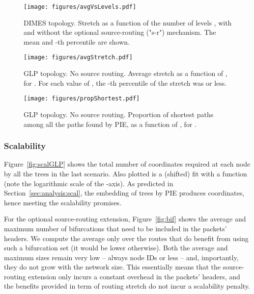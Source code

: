 \documentclass[conference]{IEEEtran}
\begin{document}
\begin{figure}
\centering
\vspace{0.03in}
\texttt{[image: figures/avgVsLevels.pdf]}\vspace{-0.7em}
\caption{DIMES topology. Stretch as a function of the number of levels , with and without the optional source-routing ("s-r") mechanism. The mean and -th percentile are shown.}
\vspace{-1.2em}
\label{fig:perfDimes2}
\end{figure}

\begin{figure}
\centering
\vspace{0.03in}
\texttt{[image: figures/avgStretch.pdf]}\vspace{-0.7em}
\caption{GLP topology. No source routing. Average stretch as a function of , for . For each value of , the -th percentile of the stretch was  or less.}
\vspace{-1.2em}
\label{fig:perfGLP1}
\end{figure}

\begin{figure}
\centering
\texttt{[image: figures/propShortest.pdf]}\vspace{-0.7em}
\caption{GLP topology. No source routing. Proportion of shortest paths among all the paths found by PIE, as a function of , for .}
\vspace{-1.2em}
\label{fig:perfGLP2}
\end{figure}

\subsubsection{Scalability}
Figure~\ref{fig:scalGLP} shows the total number of coordinates required at each node by all the trees in the last scenario.
Also plotted is a (shifted) fit with a function  (note the logarithmic scale of the -axis). As predicted in Section~\ref{sec:analysis:scal}, the embedding of  trees by PIE produces  coordinates, hence meeting the scalability promises.

For the optional source-routing extension, Figure~\ref{fig:bif} shows the average and maximum number of bifurcations that need to be included in the packets' headers. We compute the average only over the routes that do benefit from using such a bifurcation set (it would be lower otherwise). 
Both the average and maximum sizes remain very low -- always  node IDs or less -- and, importantly, they do not grow with the network size. This essentially means that the source-routing extension only incurs a constant overhead in the packets' headers, and the benefits provided in term of routing stretch do not incur a scalability penalty.
\end{document}
